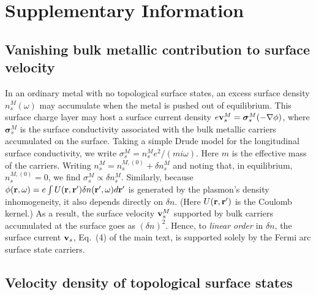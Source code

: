 \documentclass[aps,twocolumn,prl,groupedaddress]{revtex4}
\renewcommand{\vec}[1]{{\bf #1}}
\begin{document}

\section{Supplementary Information}


\subsection{Vanishing bulk metallic contribution to surface velocity}
In an ordinary metal with no topological surface states, an excess surface density $n_s^{M} (\omega)$ 
may accumulate when the metal is pushed out of equilibrium. 
This surface charge layer may host a surface current density $e\vec v_{s}^M = \boldsymbol{\sigma}_{s}^M (-\nabla \phi)$, where $\boldsymbol{\sigma}_{s}^M$ is the surface conductivity associated with the 
bulk metallic carriers accumulated on the surface. 
Taking a simple Drude model for the longitudinal surface conductivity, we write $\sigma_{s}^M = n_s^M e^2/(m i\omega)$.  
Here $m$ is the effective mass of the carriers. 
Writing $n_s^M = n_s^{M,(0)} +  \delta n_s^M$ and noting that, in equilibrium, $n_s^{M,(0)} =0$, we find $\sigma_{s}^M \propto \delta n_s^M$. 
Similarly, because $\phi(\vec r, \omega) =  e\int U(\vec r, \vec r') \delta n(\vec r', \omega) d\vec r'$ is generated by the plasmon's density inhomogeneity, it also depends directly on $\delta n$. 
(Here $U(\vec{r},\vec{r}')$ is the Coulomb kernel.)
As a result, the surface velocity $\vec v_s^M$ supported by bulk carriers accumulated at the surface  
goes as $(\delta n)^2$. 
Hence, to {\it linear order} in $\delta n$, the surface current $\vec{v}_s$, Eq.~(4) of the main text, is supported solely by the Fermi arc surface state carriers.


\subsection{Velocity density of topological surface states}
\end{document}
